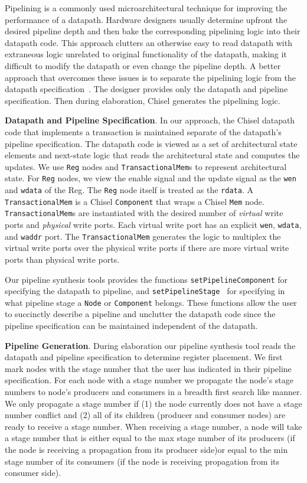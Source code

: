 Pipelining is a commonly used microarchitectural technique for
improving the performance of a datapath. Hardware designers usually
determine upfront the desired pipeline depth and then bake the
corresponding pipelining logic into their datapath code. This approach
clutters an otherwise easy to read datapath with extraneous logic
unrelated to original functionality of the datapath, making it
difficult to modify the datapath or even change the pipeline depth. A
better approach that overcomes these issues is to separate the
pipelining logic from the datapath specification~\cite{hoe:syn}. The
designer provides only the datapath and pipeline specification. Then during
elaboration, Chisel generates the pipelining logic.

{\bf Datapath and Pipeline Specification}. In our approach, the Chisel
datapath code that implements a transaction is maintained separate of
the datapath's pipeline specification. The datapath code is viewed as
a set of architectural state elements and next-state logic that reads
the architectural state and computes the updates. We use {\tt Reg}
nodes and {\tt TransactionalMem}s to represent architectural
state. For {\tt Reg} nodes, we view the enable signal and the
update signal as the {\tt wen} and {\tt wdata} of the Reg. The {\tt Reg}
node itself is treated as the {\tt rdata}. A {\tt TransactionalMem} is
a Chisel {\tt Component} that wraps a Chisel {\tt Mem} node. 
{\tt TransactionalMem}s are instantiated with the desired number of
{\it virtual} write ports and {\it physical} write ports. Each
virtual write port has an explicit {\tt wen}, {\tt wdata}, and {\tt waddr}
port. The {\tt TransactionalMem} generates the logic to multiplex the
virtual write ports over the physical write ports if there are more
virtual write ports than physical write ports.

Our pipeline synthesis tools provides the functions
{\tt setPipelineComponent} for specifying the datapath to pipeline,
and {\tt setPipelineStage } for specifying in what pipeline stage a {\tt Node}
or {\tt Component} belongs. These functions allow the user to
succinctly describe a pipeline and unclutter the datapath code since
the pipeline specification can be maintained independent of the datapath.

{\bf Pipeline Generation}. During elaboration our pipeline synthesis
tool reads the datapath and pipeline specification to determine
register placement. We first mark nodes with the stage number that the
user has indicated in their pipeline specification. For each node with
a stage number we propagate the node's stage numbers to node's
producers and consumers in a breadth first search like manner. We only
propagate a stage number if (1) the node currently does not have a stage
number conflict and (2) all of its children (producer and consumer nodes)
are ready to receive a stage number. When receiving a stage number, a
node will take a stage number that is either equal to the max stage number of
its producers (if the node is receiving a propagation from its producer
side)or equal to the min stage number of its consumers (if the node is
receiving propagation from its consumer side).

